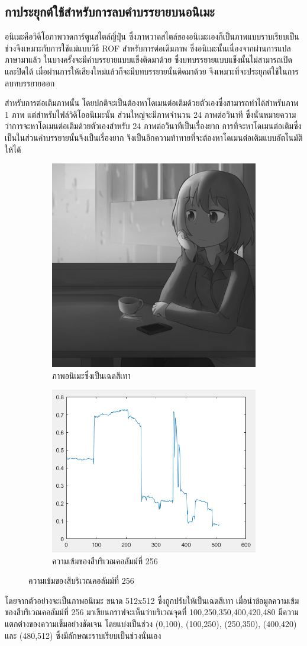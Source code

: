 \documentclass[hidelinks,a4paper,14pt]{article}
\numberwithin{equation}{section}							%
\begin{document}
{			%
			\subsection{กาประยุกต์ใช้สำหรับการลบคำบรรยายบนอนิเมะ}
			\hspace{0.85cm}อนิเมะคือวิดีโอภาพวาดการ์ตูนสไตล์ญี่ปุ่น ซึ่งภาพวาดสไตล์ของอนิเมะเองก็เป็นภาพแบบราบเรียบเป็นช่วงจึงเหมาะกับการใช้แม่แบบวิธี ROF สำหรับการต่อเติมภาพ	ซึ่งอนิเมะนั้นเนื่องจากผ่านการแปลภาษามาแล้ว ในบางครั้งจะมีคำบรรยายแบบแข็งติดมาด้วย ซึ่งบทบรรยายแบบแข็งนั้นไม่สามารถเปิดและปิดได้ เมื่อผ่านการให้เสียงใหม่แล้วก็จะมีบทบรรยายนั้นติดมาด้วย จึงเหมาะที่จะประยุกต์ใช้ในการลบทบรรยายออก

			สำหรับการต่อเติมภาพนั้น โดยปกติจะเป็นต้องหาโดเมนต่อเติมด้วยตัวเองซึ่งสามารถทำได้สำหรับภาพ  1 ภาพ แต่สำหรับไฟล์วิดีโออนิเมะนั้น ส่วนใหญ่จะมีภาพจำนวน 24 ภาพต่อวินาที ซึ่งนั่นหมายความว่าการจะหาโดเมนต่อเติมด้วยตัวเองสำหรับ 24 ภาพต่อวินาทีเป็นเรื่องยาก การที่จะหาโดเมนต่อเติมซึ่งเป็นในส่วนคำบรรยายนั้นจึงเป็นเรื่องยาก จึงเป็นอีกความท้าทายที่จะต้องหาโดเมนต่อเติมแบบอัตโนมัติให้ได้
			
			\begin{figure}[H]
				\centering
				\begin{subfigure}{0.4\linewidth}
					\centering
					\includegraphics[width=0.4\linewidth]{images/show_peicewise/anime_gray.png}
					\caption{ภาพอนิเมะซึ่งเป็นเฉดสีเทา}
				\end{subfigure}
				\begin{subfigure}{0.4\linewidth}
					\centering
					\includegraphics[width=0.4\linewidth]{images/show_peicewise/anime_is_piecewise.png}
					\caption{ความเข้มของสีบริเวณคอลัมม์ที่ 256}
				\end{subfigure}				
			\end{figure}
			โดยจากตัวอย่างจะเป็นภาพอนิเมะ ขนาด 512x512 ซึ่งถูกปรับให้เป็นเฉดสีเทา เมื่อนำข้อมูลความเข้มของสีบริเวณคอลัมม์ที่ 256 มาเขียนกราฟจะเห็นว่าบริเวณจุดที่ 100,250,350,400,420,480 มีความแตกต่างของความเข็มอย่างชัดเจน โดยแบ่งเป็นช่วง (0,100), (100,250), (250,350), (400,420)  และ (480,512) ซึ่งมีลักษณะราบเรียบเป็นช่วงนั่นเอง
		
}
\end{document}
